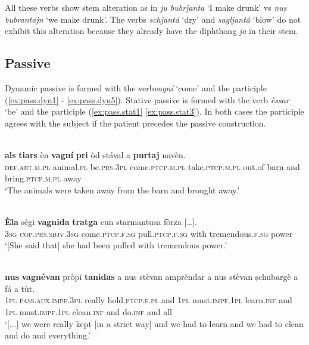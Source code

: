 All these verbs show stem alteration as in \textit{ju bubrjanta} `I make drunk' vs \textit{nuṣ bubrantajn} `we make drunk'. The verbs \textit{schjantá} `dry' and \textit{sagljantá} `blow' do not exhibit this alteration because they already have the diphthong \textit{ja} in their stem.

\subsection{Passive}
Dynamic passive is formed with the verb\textit{vagní} ‘come’ and the participle (\ref{ex:pass.dyn1} - \ref{ex:pass.dyn5}). Stative passive is formed with the verb \textit{èssar} `be' and the participle (\ref{ex:pass.stat1} \ref{ex:pass.stat3}). In both cases the participle agrees with the subject if the patient precedes the passive construction.

\ea
\label{ex:pass.dyn1}
 {\citealt[53]{Büchli1966}}\\
\gll    [...] \textbf{als} \textbf{tiars} èn \textbf{vagní} \textbf{pri} òd stával a \textbf{purtaj} navèn.\\
{}    \textsc{def.art.m.pl}  animal.\textsc{pl}  be.\textsc{prs.3pl}   come.\textsc{ptcp.m.pl}   take.\textsc{ptcp.m.pl}  out.of barn and bring.\textsc{ptcp.m.pl}  away\\
\glt `The animals were taken away from the barn and brought away.'
\z

\ea
\label{ex:pass.dyn2}
\\
\gll \textbf{Èla} ségi \textbf{vagnida} \textbf{tratga} cun starmantusa fòrza […].\\
\textsc{3sg} \textsc{cop.prs.sbjv.3sg} come.\textsc{ptcp.f.sg} pull.\textsc{ptcp.f.sg} with tremendous.\textsc{f.sg} power\\
\glt `[She said that] she had been pulled with tremendous power.'
\z

\ea
\label{ex:pass.dyn3}
\\
\gll    [...] \textbf{nus} \textbf{vagnévan} pròpi \textbf{tanidas} a nus stèvan amprèndar a nus stèvan ṣchubargè a fá a tùt.\\
{} \textsc{1pl} \textsc{pass.aux.impf.3pl} really hold.\textsc{ptcp.f.pl} and \textsc{1pl} must.\textsc{impf.1pl} learn.\textsc{inf} and \textsc{1pl}  must.\textsc{impf.1pl} clean.\textsc{inf} and do.\textsc{inf} and all\\
\glt `[...] we were really kept [in a strict way] and we had to learn and we had to clean and do and everything.'
\z

